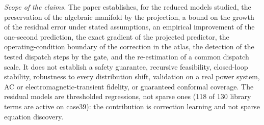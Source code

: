 \documentclass[preprint,12pt]{elsarticle}
\begin{document}
\emph{Scope of the claims.} The paper establishes, for the reduced models studied, the preservation of the algebraic manifold by the projection, a bound on the growth of the residual error under stated assumptions, an empirical improvement of the one-second prediction, the exact gradient of the projected predictor, the operating-condition boundary of the correction in the atlas, the detection of the tested dispatch steps by the gate, and the re-estimation of a common dispatch scale. It does not establish a safety guarantee, recursive feasibility, closed-loop stability, robustness to every distribution shift, validation on a real power system, AC or electromagnetic-transient fidelity, or guaranteed conformal coverage. The residual models are thresholded regressions, not sparse ones (118 of 130 library terms are active on case39): the contribution is correction learning and not sparse equation discovery.
\end{document}
